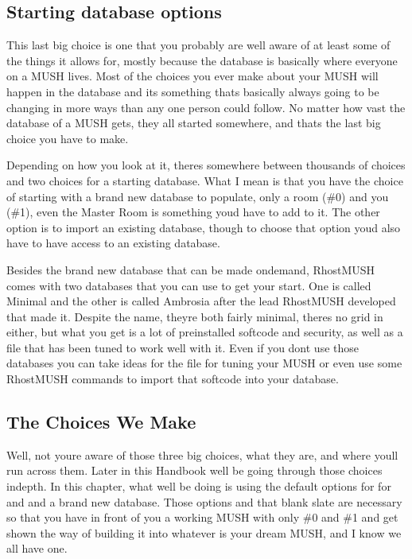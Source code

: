 \documentclass[letterpaper,10pt,english]{sphinxmanual}
\begin{document}
\subsection{Starting database options}
\label{\detokenize{install:starting-database-options}}
\sphinxAtStartPar
This last big choice is one that you probably are well aware of at least some
of the things it allows for, mostly because the database is basically where
everyone on a MUSH lives. Most of the choices you ever make about your MUSH
will happen in the database and it\textquotesingle{}s something that\textquotesingle{}s basically always going
to be changing in more ways than any one person could follow. No matter how
vast the database of a MUSH gets, they all started somewhere, and that\textquotesingle{}s the
last big choice you have to make.

\sphinxAtStartPar
Depending on how you look at it, there\textquotesingle{}s somewhere between thousands of choices
and two choices for a starting database. What I mean is that you have the
choice of starting with a brand new database to populate, only a room (\#0) and
you (\#1), even the Master Room is something you\textquotesingle{}d have to add to it. The other
option is to import an existing database, though to choose that option you\textquotesingle{}d
also have to have access to an existing database.

\sphinxAtStartPar
Besides the brand new database that can be made on\sphinxhyphen{}demand, RhostMUSH comes with
two databases that you can use to get your start. One is called \textquotesingle{}Minimal\textquotesingle{} and
the other is called \textquotesingle{}Ambrosia\textquotesingle{} after the lead RhostMUSH developed that made it.
Despite the name, they\textquotesingle{}re both fairly minimal, there\textquotesingle{}s no grid in either, but
what you get is a lot of pre\sphinxhyphen{}installed softcode and security, as well as a
 file that has been tuned to work well with it. Even if you
don\textquotesingle{}t use those databases you can take ideas for the  file for
tuning your MUSH or even use some RhostMUSH commands to import that softcode
into your database.


\subsection{The Choices We Make}
\label{\detokenize{install:the-choices-we-make}}
\sphinxAtStartPar
Well, not you\textquotesingle{}re aware of those three big choices, what they are, and where
you\textquotesingle{}ll run across them. Later in this Handbook we\textquotesingle{}ll be going through those
choices in\sphinxhyphen{}depth. In this chapter, what we\textquotesingle{}ll be doing is using the default
options for for  and  and a brand new database.
Those options and that blank slate are necessary so that you have in front of
you a working MUSH with only \#0 and \#1 and get shown the way of building it
into whatever is your dream MUSH, and I know we all have one.
\end{document}
